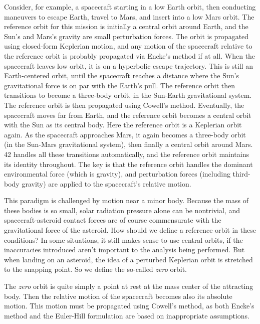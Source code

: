 \documentclass[12pt]{article}
\begin{document}
Consider, for example, a spacecraft starting in a low Earth orbit, then conducting maneuvers to escape Earth, travel to Mars, and insert into a low Mars orbit.  The reference orbit for this mission is initially a central orbit around Earth, and the Sun's and Mars's gravity are small perturbation forces.  The orbit is propagated using closed-form Keplerian motion, and any motion of the spacecraft relative to the reference orbit is probably propagated via Encke's method if at all.  When the spacecraft leaves low orbit, it is on a hyperbolic escape trajectory.  This is still an Earth-centered orbit, until the spacecraft reaches a distance where the Sun's gravitational force is on par with the Earth's pull.  The reference orbit then transitions to become a three-body orbit, in the Sun-Earth gravitational system.  The reference orbit is then propagated using Cowell's method.  Eventually, the spacecraft moves far from Earth, and the reference orbit becomes a central orbit with the Sun as its central body.  Here the reference orbit is a Keplerian orbit again.  As the spacecraft approaches Mars, it again becomes a three-body orbit (in the Sun-Mars gravitational system), then finally a central orbit around Mars.  42 handles all these transitions automatically, and the reference orbit maintains its identity throughout.  The key is that the reference orbit handles the dominant environmental force (which is gravity), and perturbation forces (including third-body gravity) are applied to the spacecraft's relative motion.

This paradigm is challenged by motion near a minor body.  Because the mass of these bodies is so small, solar radiation pressure alone can be nontrivial, and spacecraft-asteroid contact forces are of course commensurate with the gravitational force of the asteroid.  How should we define a reference orbit in these conditions?  In some situations, it still makes sense to use central orbits, if the inaccuracies introduced aren't important to the analysis being performed.  But when landing on an asteroid, the idea of a perturbed Keplerian orbit is stretched to the snapping point.  So we define the so-called {\em zero} orbit.  

The {\em zero} orbit is quite simply a point at rest at the mass center of the attracting body.  Then the relative motion of the spacecraft becomes also its absolute motion.  This motion must be propagated using Cowell's method, as both Encke's method and the Euler-Hill formulation are based on inappropriate assumptions.
\end{document}
